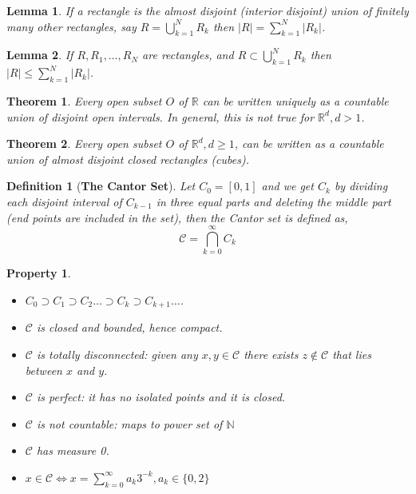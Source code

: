 \documentclass{report}
\theoremstyle{upthm}
\newtheorem{thm}{Theorem}
\newtheorem{defn}{Definition}
\newtheorem{lemma}{Lemma}
\newtheorem{property}{Property}
\newcommand{\reals}{\mathbb{R}}
\newcommand{\naturals}{\mathbb{N}}
\newcommand{\calC}{{\mathcal{C}}}
\newcommand{\tb}[1]{{\textbf{#1}}}
\newcommand{\set}[1]{\big\lbrace #1 \big\rbrace}
\newcommand{\union}{\bigcup}
\newcommand{\intersection}{\bigcap}
\begin{document}
\begin{lemma}
	If a rectangle is the almost disjoint (interior disjoint) union of finitely many other rectangles, say $R = \union_{k=1}^N R_k $ then $|R| = \sum_{k=1}^{N} |R_k|$.
\end{lemma}

\begin{lemma}
	If $R, R_1, \dots,R_N$ are rectangles, and $R \subset \union_{k=1}^{N} R_k $ then$|R| \leq \sum_{k=1}^{N} |R_k|$.
\end{lemma}

\begin{thm}
	Every open subset $O$ of $\reals$ can be written uniquely as a countable union of disjoint open intervals. In general, this is not true for $\reals^d, d > 1$.
\end{thm}

\begin{thm}
	Every open subset $O$ of $\reals^d, d \geq 1$, can be written as a countable union of almost disjoint closed rectangles (cubes).
\end{thm}

\begin{defn}[\tb{The Cantor Set}]
	Let $C_0 = [0, 1]$ and we get $C_k$ by dividing each disjoint interval of $C_{k-1}$ in three equal parts and deleting the middle part (end points are included in the set), then the Cantor set is defined as,
	$$ \calC =  \intersection_{k=0}^{\infty} C_k$$
\end{defn}
\begin{property}\item
	\begin{itemize}
		\item $C_0 \supset C_1 \supset C_2 \dots \supset C_k \supset C_{k+1} \dots$.
		\item $\calC$ is closed and	bounded, hence compact. 
		\item $\calC$ is totally disconnected: given any $x, y \in \calC$ there exists $z \notin \calC$ that lies between $x$ and $y$. 
		\item $\calC$ is perfect: it has no isolated points and it is closed.
		\item $\calC$ is not countable: maps to power set of $\naturals$
		\item $\calC$ has measure 0.
		\item $x \in \calC \iff x = \sum_{k=0}^{\infty} a_k 3^{-k}, a_k \in \set{0, 2}$ 
	\end{itemize}
\end{property}
\end{document}
